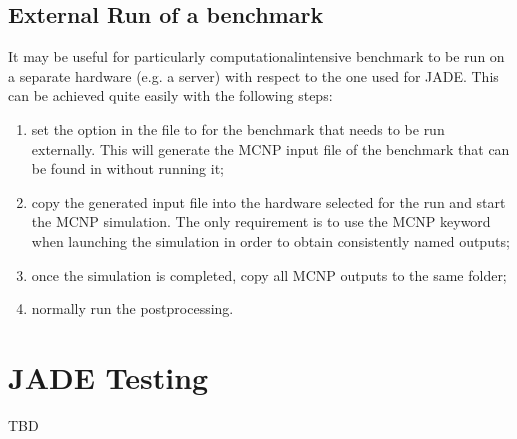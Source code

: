 \documentclass[letterpaper,10pt,english]{sphinxmanual}
\begin{document}
\section{External Run of a benchmark}
\label{\detokenize{usage/tipstricks:external-run-of-a-benchmark}}\label{\detokenize{usage/tipstricks:externalrun}}
It may be useful for particularly computational\sphinxhyphen{}intensive benchmark to be
run on a separate hardware (e.g. a server) with respect to the one used for JADE.
This can be achieved quite easily with the following steps:
\begin{enumerate}
%
\item {} 
set the  option in the 
file to  for the benchmark that needs to be run externally. This
will generate the MCNP input file of the benchmark that can be found in
without running it;

\item {} 
copy the generated input file into the hardware selected for the run and start the
MCNP simulation. The only requirement is to use the MCNP keyword  
when launching the simulation in order to obtain consistently named outputs;

\item {} 
once the simulation is completed, copy all MCNP outputs to the same
 folder;

\item {} 
normally run the post\sphinxhyphen{}processing.

\end{enumerate}


\chapter{JADE Testing}
\label{\detokenize{testing/testing:jade-testing}}\label{\detokenize{testing/testing::doc}}
TBD
\end{document}
